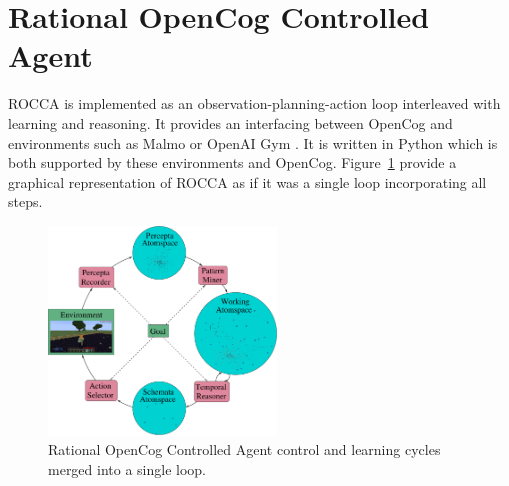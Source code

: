 \documentclass[runningheads]{llncs}
\begin{document}
\section{Rational OpenCog Controlled Agent}
\label{sec:rocca}
ROCCA is implemented as an observation-planning-action loop
interleaved with learning and reasoning.  It provides an interfacing
between OpenCog and environments such as Malmo \cite{Johnson2016} or
OpenAI Gym \cite{Brockman2016}.  It is written in Python which is both
supported by these environments and OpenCog.  Figure~\ref{fig:rocca}
provide a graphical representation of ROCCA as if it was a single loop
incorporating all steps.
\begin{figure}
  \vspace{10pt}
  \begin{center}
    \includegraphics[width=0.54\textwidth]{pictures/rocca-chart-v0.7.pdf}
  \end{center}
  \vspace{-20pt}
  \caption{Rational OpenCog Controlled Agent control and learning
    cycles merged into a single loop.}
  \vspace{-32pt}
  \label{fig:rocca}
\end{figure}
\end{document}
